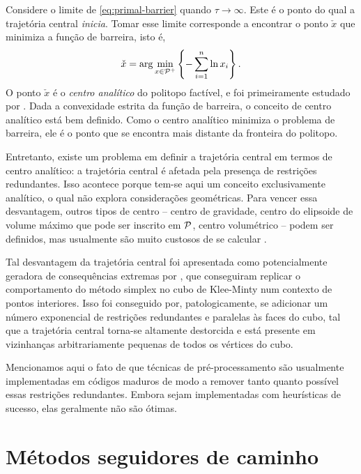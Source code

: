 Considere o limite de \eqref{eq:primal-barrier} quando $\tau\to \infty$. Este é
o ponto do qual a trajetória central \emph{inicia}. Tomar esse limite 
corresponde a encontrar o ponto $\check{x}$ que minimiza a função de barreira,
isto é, 
\[
\check{x} = \arg \min_{x\in\mathcal{P}^+}\left\{-\sum_{i=1}^{n}\ln x_i \right\}.
\]
O ponto $\check{x}$ é o \emph{centro analítico} do politopo factível, e foi
primeiramente estudado por \textcite{Sonnevend:1986ua}. Dada a convexidade estrita
da função de barreira, o conceito de centro analítico está bem definido. Como o
centro analítico minimiza o problema de barreira, ele é o ponto que se encontra
mais distante da fronteira do politopo. 

Entretanto, existe um problema em
definir a trajetória central em termos de centro analítico: a trajetória central
é afetada pela presença de restrições redundantes. Isso acontece porque tem-se
aqui um conceito exclusivamente analítico, o qual não explora considerações
geométricas. Para vencer essa desvantagem, outros tipos de centro -- centro de
gravidade, centro do elipsoide de volume máximo que pode ser inscrito em
$\mathcal{P}$, centro volumétrico  -- podem ser definidos, mas usualmente são muito
custosos de se calcular \cite{Gonzaga:1992uj}.


Tal desvantagem da trajetória central foi  apresentada como potencialmente
geradora de consequências extremas por \textcite{Deza:2006hm}, que conseguiram
replicar o comportamento do método simplex no cubo de Klee-Minty num contexto de
pontos interiores. Isso foi conseguido por, patologicamente, se adicionar um
número exponencial de restrições redundantes e paralelas às faces do cubo, tal que a trajetória
central torna-se altamente destorcida e está presente em vizinhanças
arbitrariamente pequenas de todos os vértices do cubo. 

Mencionamos aqui o fato de que técnicas de pré-processamento são usualmente
implementadas em códigos maduros de modo a remover tanto quanto possível essas
restrições redundantes. Embora  sejam implementadas com heurísticas de
sucesso, elas geralmente não são ótimas.







 
\section{Métodos seguidores de caminho\label{sec:path-following-methods}}



